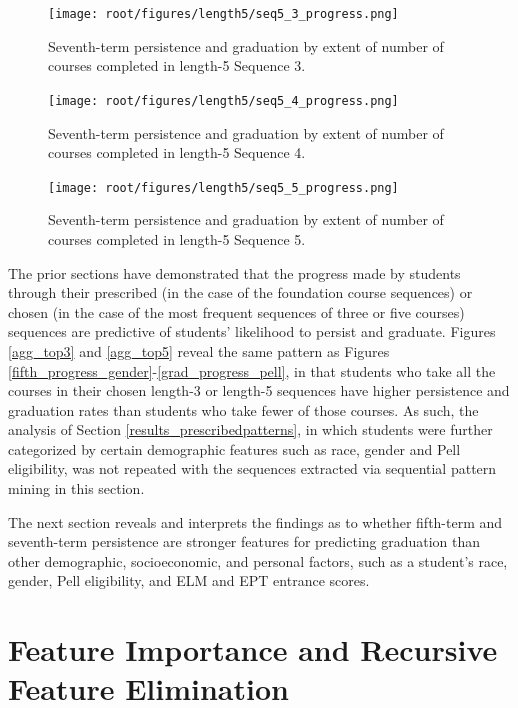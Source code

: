 \begin{figure}[htbp]
\centering
\texttt{[image: root/figures/length5/seq5\_3\_progress.png]}
\caption{Seventh-term persistence and graduation by extent of number of courses completed in length-5 Sequence 3.}
\label{seq5_3}
\end{figure}

\begin{figure}[htbp]
\centering
\texttt{[image: root/figures/length5/seq5\_4\_progress.png]}
\caption{Seventh-term persistence and graduation by extent of number of courses completed in length-5 Sequence 4.}
\label{seq5_4}
\end{figure}

\begin{figure}[htbp]
\centering
\texttt{[image: root/figures/length5/seq5\_5\_progress.png]}
\caption{Seventh-term persistence and graduation by extent of number of courses completed in length-5 Sequence 5.}
\label{seq5_5}
\end{figure}

The prior sections have demonstrated that the progress made by students through their prescribed (in the case of the foundation course sequences) or chosen (in the case of the most frequent sequences of three or five courses) sequences are predictive of students' likelihood to persist and graduate.  Figures \ref{agg_top3} and \ref{agg_top5} reveal the same pattern as Figures \ref{fifth_progress_gender}-\ref{grad_progress_pell}, in that students who take all the courses in their chosen length-3 or length-5 sequences have higher persistence and graduation rates than students who take fewer of those courses.  As such, the analysis of Section \ref{results_prescribedpatterns}, in which students were further categorized by certain demographic features such as race, gender and Pell eligibility, was not repeated with the sequences extracted via sequential pattern mining in this section.

The next section reveals and interprets the findings as to whether fifth-term and seventh-term persistence are stronger features for predicting graduation than other demographic, socioeconomic, and personal factors, such as a student's race, gender, Pell eligibility, and ELM and EPT entrance scores. 

\section{Feature Importance and Recursive Feature Elimination}
\label{results_section_featureimportance}

